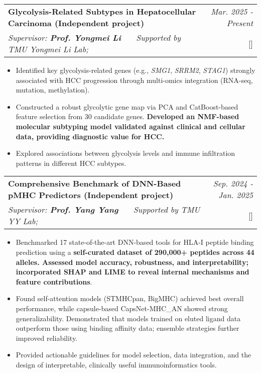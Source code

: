 \documentclass[a4paper,11pt]{article}
\makeatletter
\newcommand{\resumeProject}[4]{
\vspace{0.5mm}\item
    \begin{tabular*}{0.98\textwidth}[t]{l@{\extracolsep{\fill}}r}
        \textbf{#1} & \textit{\footnotesize{#3}} \\
        \footnotesize{\textit{#2}} & \footnotesize{#4}
    \end{tabular*}
    \vspace{-2.4mm}
}
\newcommand{\resumeItemListStart}{\begin{itemize}[leftmargin=*,labelsep=1mm,itemsep=0.5mm]}
\newcommand{\resumeItemListEnd}{\end{itemize}\vspace{-2mm}}
\makeatother
\begin{document}
\begin{justify}
\resumeProject
  {Glycolysis-Related Subtypes in Hepatocellular Carcinoma \small{(Independent project)}}
  {Supervisor: \textbf{Prof. Yongmei Li} \ \ \ Supported by TMU Yongmei Li Lab;}
  {Mar. 2025 - Present}
  {{}[\href{https://github.com/wunaiwuhuang/materials/tree/main/Award\_and\_honour\%E8\%8E\%B7\%E5\%A5\%96\%E8\%AF\%81\%E6\%98\%8E/innovation\%20and\%20Entrepreneurship\%20Competition}{\textcolor{darkblue}{\faGithub}}]}
\resumeItemListStart
  \item Identified key glycolysis-related genes (e.g., \textit{SMG1}, \textit{SRRM2}, \textit{STAG1}) strongly associated with HCC progression through multi-omics integration (RNA-seq, mutation, methylation).
  \item Constructed a robust glycolytic gene map via PCA and CatBoost-based feature selection from 30 candidate genes. \textbf{Developed an NMF-based molecular subtyping model validated against clinical and cellular data, providing diagnostic value for HCC.}
  \item Explored associations between glycolysis levels and immune infiltration patterns in different HCC subtypes.
\resumeItemListEnd

\resumeProject
  {Comprehensive Benchmark of DNN-Based pMHC Predictors \small{(Independent project)}}
  {Supervisor: \textbf{Prof. Yang Yang} \ \ \ Supported by TMU YY Lab;}
  {Sep. 2024 - Jan. 2025}
  {{}[\href{https://github.com/wunaiwuhuang/materials/tree/main/Award\_and\_honour\%E8\%8E\%B7\%E5\%A5\%96\%E8\%AF\%81\%E6\%98\%8E/innovation\%20and\%20Entrepreneurship\%20Competition}{\textcolor{darkblue}{\faGithub}}]}
\resumeItemListStart
  \item Benchmarked 17 state-of-the-art DNN-based tools for HLA-I peptide binding prediction using a \textbf{self-curated dataset of 290,000+ peptides across 44 alleles. Assessed model accuracy, robustness, and interpretability; incorporated SHAP and LIME to reveal internal mechanisms and feature contributions}.
  \item Found self-attention models (STMHCpan, BigMHC) achieved best overall performance, while capsule-based CapsNet-MHC\_AN showed strong generalizability. Demonstrated that models trained on eluted ligand data outperform those using binding affinity data; ensemble strategies further improved reliability.
  \item Provided actionable guidelines for model selection, data integration, and the design of interpretable, clinically useful immunoinformatics tools.
\resumeItemListEnd


\end{justify}
\end{document}
